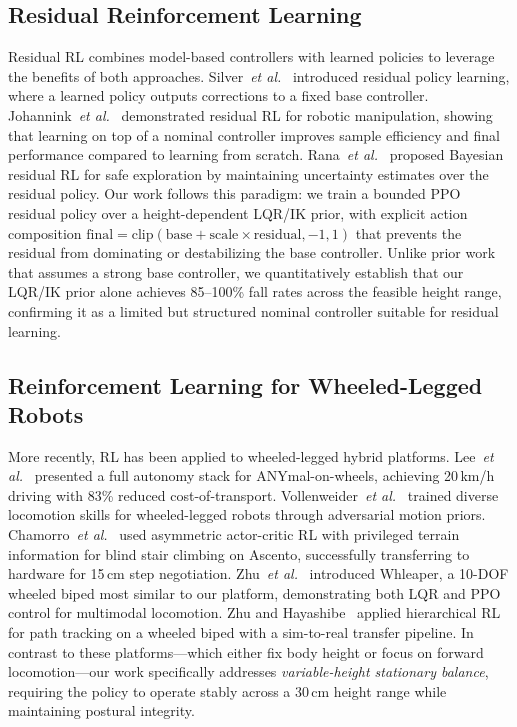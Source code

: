 \documentclass[conference]{IEEEtran}
\begin{document}
\subsection{Residual Reinforcement Learning}
Residual RL combines model-based controllers with learned policies to leverage
the benefits of both approaches.
Silver~\emph{et al.}~\cite{silver2018residual} introduced residual policy learning,
where a learned policy outputs corrections to a fixed base controller.
Johannink~\emph{et al.}~\cite{johannink2019residual} demonstrated residual RL
for robotic manipulation, showing that learning on top of a nominal controller
improves sample efficiency and final performance compared to learning from scratch.
Rana~\emph{et al.}~\cite{rana2020bayesianresidual} proposed Bayesian residual RL
for safe exploration by maintaining uncertainty estimates over the residual policy.
Our work follows this paradigm: we train a bounded PPO residual policy over a
height-dependent LQR/IK prior, with explicit action composition
$\text{final} = \text{clip}(\text{base} + \text{scale} \times \text{residual}, -1, 1)$
that prevents the residual from dominating or destabilizing the base controller.
Unlike prior work that assumes a strong base controller, we quantitatively
establish that our LQR/IK prior alone achieves 85--100\% fall rates across
the feasible height range, confirming it as a limited but structured nominal
controller suitable for residual learning.

\subsection{Reinforcement Learning for Wheeled-Legged Robots}
More recently, RL has been applied to wheeled-legged hybrid platforms.
Lee~\emph{et al.}~\cite{lee2024robustnavigation} presented a full autonomy
stack for ANYmal-on-wheels, achieving 20\,km/h driving with 83\% reduced
cost-of-transport.
Vollenweider~\emph{et al.}~\cite{vollenweider2023advancedskills} trained diverse
locomotion skills for wheeled-legged robots through adversarial motion priors.
Chamorro~\emph{et al.}~\cite{chamorro2024stairclimbing} used asymmetric
actor-critic RL with privileged terrain information for blind stair climbing
on Ascento, successfully transferring to hardware for 15\,cm step negotiation.
Zhu~\emph{et al.}~\cite{whleaper2024} introduced Whleaper, a 10-DOF wheeled
biped most similar to our platform, demonstrating both LQR and PPO control
for multimodal locomotion.
Zhu and Hayashibe~\cite{zhu2022hierarchical} applied hierarchical RL for
path tracking on a wheeled biped with a sim-to-real transfer pipeline.
In contrast to these platforms---which either fix body height or focus on
forward locomotion---our work specifically addresses \emph{variable-height
stationary balance}, requiring the policy to operate stably across a 30\,cm
height range while maintaining postural integrity.
\end{document}
